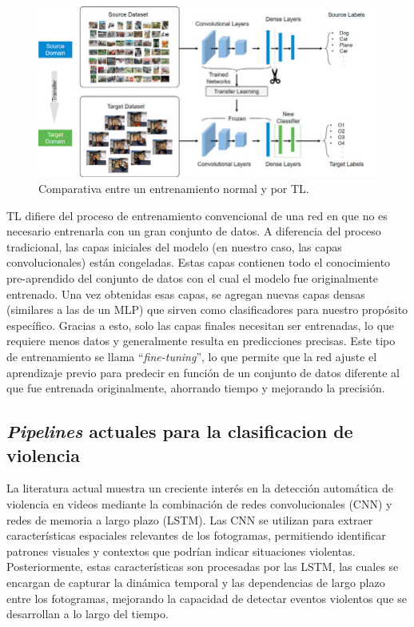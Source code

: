 \begin{figure}[h!]
\includegraphics[width=1\textwidth]{images/transfer-learning.png}
\centering
\caption{Comparativa entre un entrenamiento normal y por TL\protect\cite{transfer-learning}.}
\label{transfer-learning}
\end{figure}

TL difiere del proceso de entrenamiento convencional de una 
red en que no es necesario entrenarla con un gran conjunto de 
datos. A diferencia del proceso tradicional, las capas iniciales 
del modelo (en nuestro caso, las capas convolucionales) están 
congeladas. Estas capas contienen todo el conocimiento pre-aprendido 
del conjunto de datos con el cual el modelo fue originalmente entrenado. 
Una vez obtenidas esas capas, se agregan nuevas capas densas (similares 
a las de un MLP) que sirven como clasificadores para nuestro propósito 
específico. Gracias a esto, solo las capas finales necesitan ser entrenadas, 
lo que requiere menos datos y generalmente resulta en predicciones precisas. 
Este tipo de entrenamiento se llama ``\textit{fine-tuning}'', lo que permite 
que la red ajuste el aprendizaje previo para predecir en función de un conjunto 
de datos diferente al que fue entrenada originalmente, ahorrando tiempo y 
mejorando la precisión.

\subsection{\textit{Pipelines} actuales para la clasificacion de violencia}

La literatura actual muestra un creciente interés en la 
detección automática de violencia en videos mediante la 
combinación de redes convolucionales (CNN) y redes de 
memoria a largo plazo (LSTM)\cite{sudhakaran2017learning}. 
Las CNN se utilizan para extraer características espaciales 
relevantes de los fotogramas, permitiendo identificar 
patrones visuales y contextos que podrían indicar situaciones 
violentas. Posteriormente, estas características son procesadas 
por las LSTM, las cuales se encargan de capturar la dinámica 
temporal y las dependencias de largo plazo entre los 
fotogramas, mejorando la capacidad de detectar eventos 
violentos que se desarrollan a lo largo del tiempo.\\

